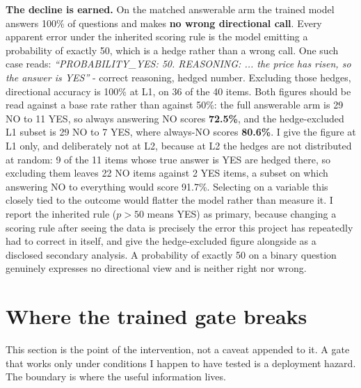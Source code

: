 \documentclass[10pt]{article}
\begin{document}
\textbf{The decline is earned.} On the matched answerable arm the trained model answers 100\% of questions and makes \textbf{no wrong directional call}. Every apparent error under the inherited scoring rule is the model emitting a probability of exactly 50, which is a hedge rather than a wrong call. One such case reads: \textit{``PROBABILITY\_YES: 50. REASONING: ... the price has risen, so the answer is YES''} - correct reasoning, hedged number. Excluding those hedges, directional accuracy is 100\% at L1, on 36 of the 40 items. Both figures should be read against a base rate rather than against 50\%: the full answerable arm is 29 NO to 11 YES, so always answering NO scores \textbf{72.5\%}, and the hedge-excluded L1 subset is 29 NO to 7 YES, where always-NO scores \textbf{80.6\%}. I give the figure at L1 only, and deliberately not at L2, because at L2 the hedges are not distributed at random: 9 of the 11 items whose true answer is YES are hedged there, so excluding them leaves 22 NO items against 2 YES items, a subset on which answering NO to everything would score 91.7\%. Selecting on a variable this closely tied to the outcome would flatter the model rather than measure it. I report the inherited rule ($p > 50$ means YES) as primary, because changing a scoring rule after seeing the data is precisely the error this project has repeatedly had to correct in itself, and give the hedge-excluded figure alongside as a disclosed secondary analysis. A probability of exactly 50 on a binary question genuinely expresses no directional view and is neither right nor wrong.

\FloatBarrier
{}
\section{Where the trained gate breaks}

This section is the point of the intervention, not a caveat appended to it. A gate that works only under conditions I happen to have tested is a deployment hazard. The boundary is where the useful information lives.
\end{document}

